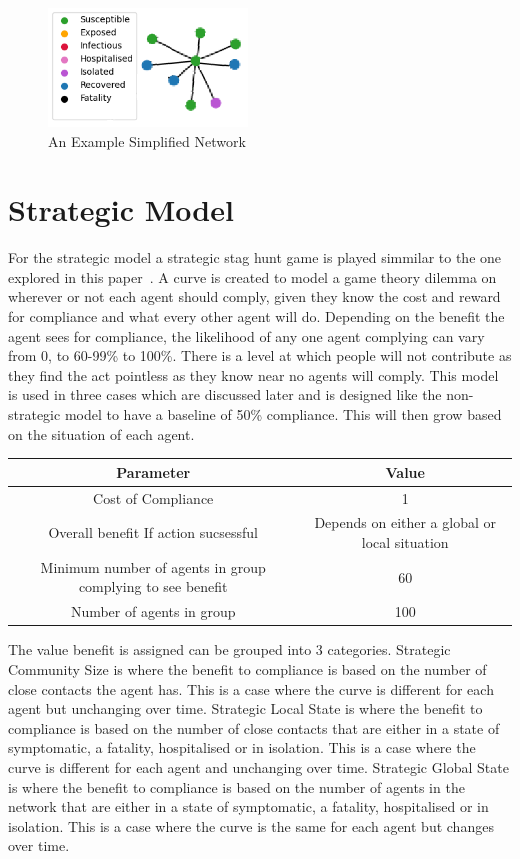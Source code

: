 \documentclass{article}
\begin{document}
\begin{figure}[h!]
\centering
\includegraphics[width =150pt]{basicnet}
\caption{An Example Simplified Network}
\end{figure}

\newpage
\section{Strategic Model}
For the strategic model a strategic stag hunt game is played simmilar to the one explored in this paper~\cite{pacheco_santos_souza_2014}.  A curve is created to model a game theory dilemma on wherever or not each agent should comply, given they know the cost and reward for compliance and what every other agent will do. Depending on the benefit the agent sees for compliance, the likelihood of any one agent complying can vary from 0, to 60-99\% to 100\%. There is a level at which people will not contribute as they find the act pointless as they know near no agents will comply. This model is used in three cases which are discussed later and is designed like the non-strategic model to have a baseline of 50\% compliance. This will then grow based on the situation of each agent.\newline

\begin{tabular}{|c|c|}
\hline
Parameter & Value \\ \hline
Cost of Compliance & 1 \\ \hline
Overall benefit If action sucsessful & Depends on either a global or local situation\\ \hline
Minimum number of agents in group complying to see benefit & 60\\ \hline
Number of agents in group & 100\\ \hline
\end{tabular}
\newline

The value benefit  is assigned can be grouped into 3 categories. Strategic Community Size is where the benefit to compliance is based on the number of close contacts the agent has. This is a case where the curve is different for each agent but unchanging over time. Strategic Local State is where the benefit to compliance is based on the number of close contacts that are either in a state of symptomatic, a fatality, hospitalised or in isolation. This is a case where the curve is different for each agent and unchanging over time. Strategic Global State is where the benefit to compliance is based on the number of agents in the network that are either in a state of symptomatic, a fatality, hospitalised or in isolation. This is a case where the curve is the same for each agent but changes over time.
\end{document}
